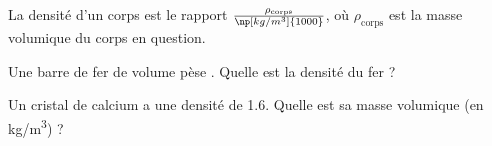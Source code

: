 
\finEntrainement





\hauteurLargeurCadreReponse		{8mm}{2cm}
\initialisationEntrainement

La densité d'un corps est le rapport $\frac{\rho_{\text{corps}}}{\np[kg/m^3]{1000}}$, où $\rho_{\text{corps}}$ est la masse volumique du corps en question.



\debutEntrainement


\begin{enonce}
Une barre de fer de volume  pèse . Quelle est la densité du fer ?
\end{enonce}






\begin{enonce}
Un cristal de calcium a une densité de \num{1,6}.
Quelle est sa masse volumique (en \si{kg/m^3}) ? 
\end{enonce}

